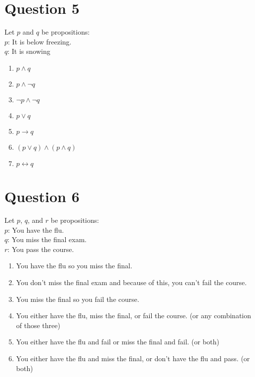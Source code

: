 \documentclass[12pt]{extarticle}
\begin{document}
\section*{Question 5}
	Let $p$ and $q$ be propositions:\\
		\hspace*{1cm}$p$: It is below freezing.\\
		\hspace*{1cm}$q$: It is snowing\\
	\begin{enumerate}
		\item $p \wedge q$
		\item $p \wedge \neg q$
		\item $\neg p \wedge \neg q$
		\item $p \vee q$
		\item $p \to q$
		\item $(p \vee q) \wedge (p \wedge q)$
		\item $p \leftrightarrow q$
	\end{enumerate}

\section*{Question 6}
	Let $p$, $q$, and $r$ be propositions:\\
		\hspace*{1cm}$p$: You have the flu.\\
		\hspace*{1cm}$q$: You miss the final exam.\\
		\hspace*{1cm}$r$: You pass the course.\\
	\begin{enumerate}
		\item You have the flu so you miss the final.
		\item You don't miss the final exam and because of this, you can't fail the course.
		\item You miss the final so you fail the course.
		\item You either have the flu, miss the final, or fail the course. (or any combination of those three)
		\item You either have the flu and fail or miss the final and fail. (or both) 
		\item You either have the flu and miss the final, or don't have the flu and pass. (or both)
	\end{enumerate}
	\clearpage
\end{document}
